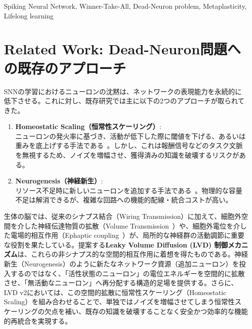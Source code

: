 \documentclass[submit]{ipsj}
\begin{document}
\begin{ekeyword}
Spiking Neural Network, Winner-Take-All, Dead-Neuron problem, Metaplasticity, Lifelong learning
\end{ekeyword}

\maketitle

\section{Related Work: Dead-Neuron問題への既存のアプローチ}
SNNの学習におけるニューロンの沈黙は、ネットワークの表現能力を永続的に低下させる。これに対し、既存研究では主に以下の2つのアプローチが取られてきた。

\begin{enumerate}
    \item \textbf{Homeostatic Scaling（恒常性スケーリング）}: \\
    ニューロンの発火率に基づき、活動が低下した際に閾値を下げる、あるいは重みを底上げする手法である~\cite{brunel2000dynamics}。しかし、これは報酬信号などのタスク文脈を無視するため、ノイズを増幅させ、獲得済みの知識を破壊するリスクがある。
    \item \textbf{Neurogenesis（神経新生）}: \\
    リソース不足時に新しいニューロンを追加する手法である~\cite{huang2023neurogenesis}。物理的な容量不足は解消できるが、複雑な回路への機能的配線・統合コストが高い。
\end{enumerate}

生体の脳では、従来のシナプス結合（Wiring Transmission）に加えて、細胞外空間を介した神経伝達物質の拡散（Volume Transmission~\cite{agnati1995intercellular}）や、細胞外電位を介した電場的相互作用（Ephaptic coupling~\cite{anastassiou2011ephaptic}）が、局所的な神経群の活動調節に重要な役割を果たしている。提案する\textbf{Leaky Volume Diffusion (LVD) 制御メカニズム}は、これらの非シナプス的な空間的相互作用に着想を得たものである。神経新生（Neurogenesis）のように新たなネットワーク資源（追加ニューロン）を投入するのではなく、「活性状態のニューロン」の電位エネルギーを空間的に拡散させ、「無活動なニューロン」へ再分配する構造的足場を提供する。さらに、LVD v2においては、この空間的拡散に恒常性スケーリング（Homeostatic Scaling）を組み合わせることで、単独ではノイズを増幅させてしまう恒常性スケーリングの欠点を補い、既存の知識を破壊することなく安全かつ効率的な機能的再統合を実現する。
\end{document}
